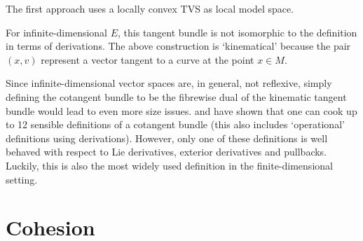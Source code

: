     The first approach uses a locally convex TVS as local model space.

    \begin{remark}
        For infinite-dimensional $E$, this tangent bundle is not isomorphic to the definition in terms of derivations. The above construction is `kinematical' because the pair $(x,v)$ represent a vector tangent to a curve at the point $x\in M$.
    \end{remark}

    Since infinite-dimensional vector spaces are, in general, not reflexive, simply defining the cotangent bundle to be the fibrewise dual of the kinematic tangent bundle would lead to even more size issues.  and  have shown that one can cook up to 12 sensible definitions of a cotangent bundle (this also includes `operational' definitions using derivations). However, only one of these definitions is well behaved with respect to Lie derivatives, exterior derivatives and pullbacks. Luckily, this is also the most widely used definition in the finite-dimensional setting.

\section{Cohesion}\label{section:cohesion}

